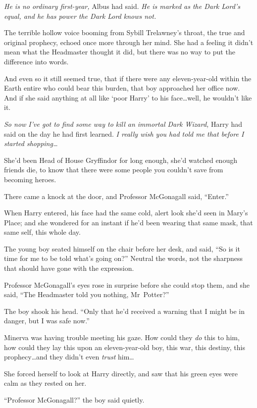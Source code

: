 \emph{He is no ordinary first-year,} Albus had said. \emph{He is marked as the
Dark Lord’s equal, and he has power the Dark Lord knows not.}

The terrible hollow voice booming from Sybill Trelawney’s throat, the true and
original prophecy, echoed once more through her mind. She had a feeling it
didn’t mean what the Headmaster thought it did, but there was no way to put the
difference into words.

And even so it still seemed true, that if there were any eleven-year-old within
the Earth entire who could bear this burden, that boy approached her office
now. And if she said anything at all like ‘poor Harry’ to his face…well,
he wouldn’t like it.

\emph{So now I’ve got to find some way to kill an immortal Dark Wizard,} Harry
had said on the day he had first learned. \emph{I really wish you had told me
that before I started shopping…}

She’d been Head of House Gryffindor for long enough, she’d watched enough
friends die, to know that there were some people you couldn’t save from
becoming heroes.

There came a knock at the door, and Professor McGonagall said, “Enter.”

When Harry entered, his face had the same cold, alert look she’d seen in Mary’s
Place; and she wondered for an instant if he’d been wearing that same mask,
that same self, this whole day.

The young boy seated himself on the chair before her desk, and said, “So is it
time for me to be told what’s going on?” Neutral the words, not the sharpness
that should have gone with the expression.

Professor McGonagall’s eyes rose in surprise before she could stop them, and
she said, “The Headmaster told you nothing, Mr~Potter?”

The boy shook his head. “Only that he’d received a warning that I might be in
danger, but I was safe now.”

Minerva was having trouble meeting his gaze. How could they \emph{do} this to
him, how could they lay this upon an eleven-year-old boy, this war, this
destiny, this prophecy…and they didn’t even \emph{trust} him…

She forced herself to look at Harry directly, and saw that his green eyes were
calm as they rested on her.

“Professor McGonagall?” the boy said quietly.

